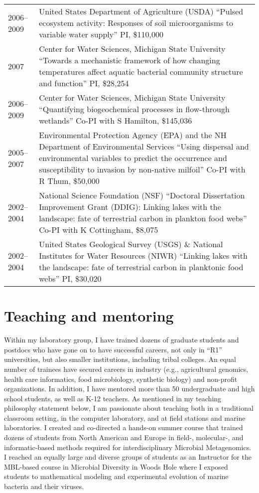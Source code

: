 \documentclass[11pt]{article}  %
\begin{document}
\begin{tabularx}{\textwidth}{@{}l@{\hspace{2em}}X@{}}
2006--2009 & United States Department of Agriculture (USDA) “Pulsed ecosystem activity: Responses of soil microorganisms to variable water supply” PI, \$110,000 \\
2007 & Center for Water Sciences, Michigan State University “Towards a mechanistic framework of how changing temperatures affect aquatic bacterial community structure and function” PI, \$28,254 \\
2006--2009 & Center for Water Sciences, Michigan State University “Quantifying biogeochemical processes in flow-through wetlands” Co-PI with S Hamilton, \$145,036 \\
2005--2007 & Environmental Protection Agency (EPA) and the NH Department of Environmental Services “Using dispersal and environmental variables to predict the occurrence and susceptibility to invasion by non-native milfoil” Co-PI with R Thum, \$50,000 \\
2002--2004 & National Science Foundation (NSF) “Doctoral Dissertation Improvement Grant (DDIG): Linking lakes with the landscape: fate of terrestrial carbon in plankton food webs” Co-PI with K Cottingham, \$8,075 \\
2002--2004 & United States Geological Survey (USGS) \& National Institutes for Water Resources (NIWR) “Linking lakes with the landscape: fate of terrestrial carbon in planktonic food webs” PI, \$30,020 \\
\end{tabularx}

\section*{Teaching and mentoring}
\vspace{-0.5em}
Within my laboratory group, I have trained dozens of graduate students and postdocs who have gone on to have successful careers, not only in “R1” universities, but also smaller institutions, including tribal colleges. An equal number of trainees have secured careers in industry (e.g., agricultural genomics, health care informatics, food microbiology, synthetic biology) and non-profit organizations. In addition, I have mentored more than 50 undergraduate and high school students, as well as K-12 teachers. As mentioned in my teaching philosophy statement below, I am passionate about teaching both in a traditional classroom setting, in the computer laboratory, and at field stations and marine laboratories. I created and co-directed a hands-on summer course that trained dozens of students from North American and Europe in field-, molecular-, and informatic-based methods required for interdisciplinary Microbial Metagenomics. I reached an equally large and diverse groups of students as an Instructor for the MBL-based course in Microbial Diversity in Woods Hole where I exposed students to mathematical modeling and experimental evolution of marine bacteria and their viruses.
\end{document}
